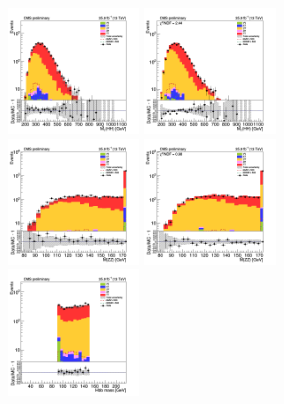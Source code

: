 \begin{figure}[tbp]
\begin{center}
    \includegraphics[width=0.31\textwidth]{figures/mm_300_april18/mm_300_good_SR_bdt_sideBand_april18/hhMt_mm_SR_prefit_plot_apr18.png}
    \includegraphics[width=0.31\textwidth]{figures/mm_300_april18/mm_300_good_SR_bdt_sideBand_april18/hhMt_mm_SR_FullPostfit_plot_apr18.png}\\
    \includegraphics[width=0.31\textwidth]{figures/mm_300_april18/mm_300_good_SR_bdt_sideBand_april18/hmass0_mm_SR_prefit_plot_apr18.png}
    \includegraphics[width=0.31\textwidth]{figures/mm_300_april18/mm_300_good_SR_bdt_sideBand_april18/hmass0_mm_SR_FullPostfit_plot_apr18.png}\\
    \includegraphics[width=0.31\textwidth]{figures/mm_300_april18/mm_300_good_SR_bdt_sideBand_april18/hmass1_mm_SR_prefit_plot_apr18.png}

\end{center}
\end{figure}
